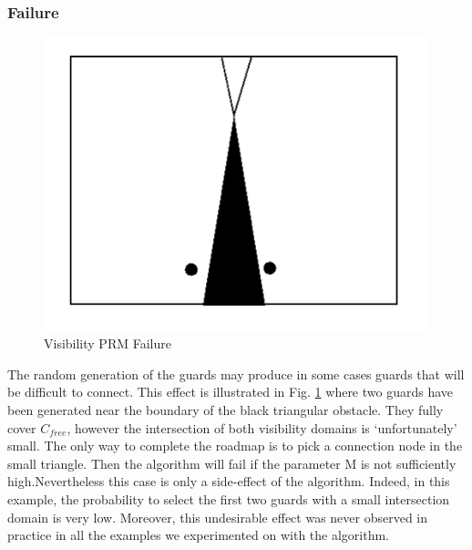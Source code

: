 \documentclass[11pt]{article}
\begin{document}
\subsubsection{Failure}
\begin{figure}[h]
\includegraphics{visibility_psm_failure}
\centering
\caption{Visibility PRM Failure}
\label{fig:vispsm_failure}
\end{figure}
The random generation of the guards may produce in some cases guards that will
be difficult to connect. This effect is illustrated in Fig. \ref{fig:vispsm_failure} where two guards have
been generated near the boundary of the black triangular obstacle. They fully cover
$C_{free}$, however the intersection of both visibility domains is ‘unfortunately’ small.
The only way to complete the roadmap is to pick a connection node in the small
triangle. Then the algorithm will fail if the parameter M is not sufficiently high.Nevertheless this case is only a side-effect of the algorithm. Indeed, in this example,
the probability to select the first two guards with a small intersection domain is very
low. Moreover, this undesirable effect was never observed in practice in all the
examples we experimented on with the algorithm.
\end{document}
